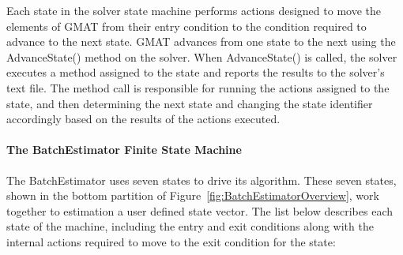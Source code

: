 Each state in the solver state machine performs actions designed to move the elements of GMAT from their entry condition to the condition required to advance to the next state.  GMAT advances from one state to the next using the AdvanceState() method on the solver.  When AdvanceState() is called, the solver executes a method assigned to the state and reports the results to the solver's text file.  The method call is responsible for running the actions assigned to the state, and then determining the next state and changing the state identifier accordingly based on the results of the actions executed.

\paragraph{The BatchEstimator Finite State Machine}

The BatchEstimator uses seven states to drive its algorithm.  These seven states, shown in the bottom partition of Figure~\ref{fig:BatchEstimatorOverview}, work together to estimation a user defined state vector.  The list below describes each state of the machine, including the entry and exit conditions along with the internal actions required to move to the exit condition for the state:

